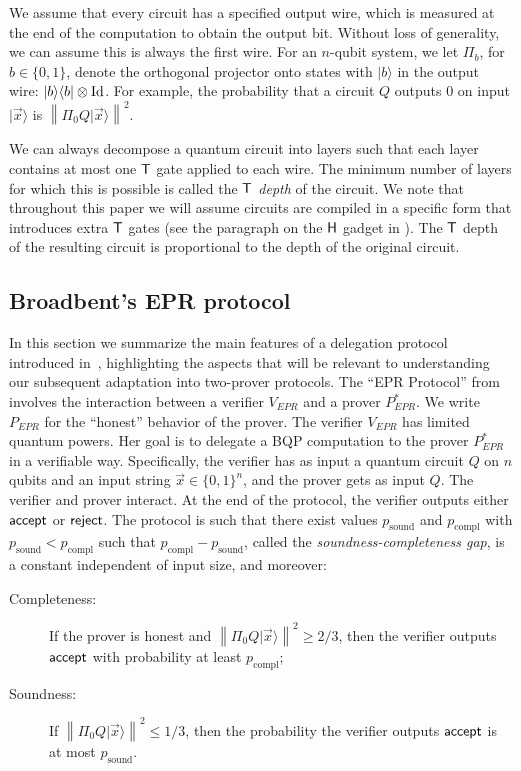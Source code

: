 \documentclass{toc}
\newcommand{\ket}[1]{|#1\rangle}
\newcommand{\bra}[1]{\langle#1|}
\newcommand{\Id}{\ensuremath{\mathop{\rm Id}\nolimits}}
\DeclareMathOperator{\sound}{sound}
\DeclareMathOperator{\compl}{compl}
\newcommand{\norm}[1]{\left\|#1\right\|}
\begin{document}
We assume that every circuit has a specified output wire, which is measured at the end of the computation to obtain the output bit. Without loss of generality, we can assume this is always the first wire. For an $n$-qubit system, we let $\Pi_b$, for $b \in \{0,1\}$, denote the orthogonal projector onto states with $\ket{b}$ in the output wire: $\ket{b}\bra{b}\otimes \Id$. For example, the probability that a circuit $Q$ outputs 0 on input $\ket{\vec{x}}$ is $\norm{\Pi_0 Q\ket{\vec{x}}}^2$. 

We can always decompose a quantum circuit into layers such that each layer contains at most one $\sf T$ gate applied to each wire. The minimum number of layers for which this is possible is called the \emph{$\sf T$ depth} of the circuit. 
We note that throughout this %
paper  %
we will assume circuits are compiled in a specific form that introduces extra $\sf T$ gates (see the paragraph on the $\sf H$ gadget in ). The $\sf T$ depth of the resulting circuit is proportional to the depth of the original circuit. 



\subsection{Broadbent's EPR protocol}  %
\label{sec:EPR-protocol}


In this section we summarize the main features of a delegation protocol introduced in~\cite{broadbent15howtoverify}, highlighting the aspects that will be relevant to understanding our subsequent adaptation into two-prover protocols. The ``EPR Protocol'' from \cite{broadbent15howtoverify} involves the interaction between a verifier $V_{EPR}$ and a prover $P_{EPR}^*$. We write $P_{EPR}$ for the ``honest'' behavior of the prover. The verifier $V_{EPR}$ has limited quantum powers. Her goal is to delegate a BQP computation to the prover $P_{EPR}^*$ in a verifiable way. Specifically, the verifier has as input a quantum circuit $Q$ on $n$ qubits and an input string $\vec{x}\in\{0,1\}^n$, and the prover gets as input $Q$. The verifier and prover interact. At the end of the protocol, the verifier outputs either $\sf accept$ or $\sf reject$. The protocol is such that there exist values $p_{\sound}$ and $p_{\compl}$ with $p_{\sound}< p_{\compl}$ such that $p_{\compl}-p_{\sound}$, called the \emph{soundness-completeness gap}, is a constant independent of input size, and moreover:

\begin{description}
\item[Completeness:] If the prover is honest and $\norm{\Pi_0Q\ket{\vec{x}}}^2 \geq 2/3$, then the verifier outputs $\sf accept$ with probability at least $p_{\compl}$;  
\item[Soundness:] If $\norm{\Pi_0Q\ket{\vec{x}}}^2 \leq 1/3$, then the probability the verifier outputs $\sf accept$ is at most $p_{\sound}$.
\end{description}
\end{document}
